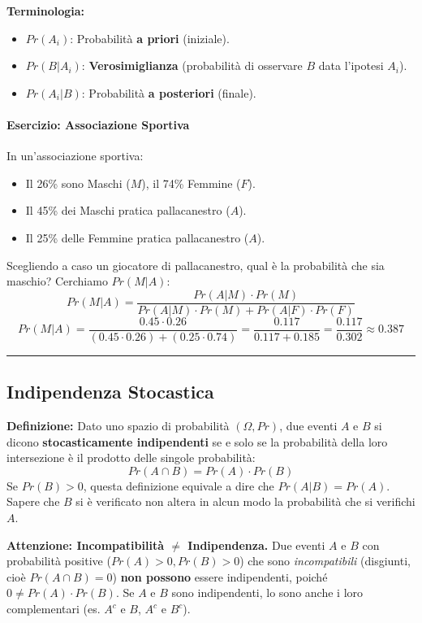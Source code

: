\documentclass[12pt, a4paper]{article}
\begin{document}
\textbf{Terminologia:}
\begin{itemize}
    \item $Pr(A_i)$: Probabilità \textbf{a priori} (iniziale).
    \item $Pr(B | A_i)$: \textbf{Verosimiglianza} (probabilità di osservare $B$ data l'ipotesi $A_i$).
    \item $Pr(A_i | B)$: Probabilità \textbf{a posteriori} (finale).
\end{itemize}

\paragraph{Esercizio: Associazione Sportiva}
In un'associazione sportiva:
\begin{itemize}
    \item Il 26\% sono Maschi ($M$), il 74\% Femmine ($F$).
    \item Il 45\% dei Maschi pratica pallacanestro ($A$).
    \item Il 25\% delle Femmine pratica pallacanestro ($A$).
\end{itemize}
Scegliendo a caso un giocatore di pallacanestro, qual è la probabilità che sia maschio? Cerchiamo $Pr(M | A)$:
$$ Pr(M | A) = \frac{Pr(A | M) \cdot Pr(M)}{Pr(A | M) \cdot Pr(M) + Pr(A | F) \cdot Pr(F)} $$
$$ Pr(M | A) = \frac{0.45 \cdot 0.26}{(0.45 \cdot 0.26) + (0.25 \cdot 0.74)} = \frac{0.117}{0.117 + 0.185} = \frac{0.117}{0.302} \approx 0.387 $$

\vspace{0.5cm}\hrule\vspace{0.5cm}

\subsection{Indipendenza Stocastica}
\textbf{Definizione:} Dato uno spazio di probabilità $(\Omega, Pr)$, due eventi $A$ e $B$ si dicono \textbf{stocasticamente indipendenti} se e solo se la probabilità della loro intersezione è il prodotto delle singole probabilità:
$$ Pr(A \cap B) = Pr(A) \cdot Pr(B) $$
Se $Pr(B) > 0$, questa definizione equivale a dire che $Pr(A | B) = Pr(A)$. Sapere che $B$ si è verificato non altera in alcun modo la probabilità che si verifichi $A$.

\textbf{Attenzione: Incompatibilità $\neq$ Indipendenza.}
Due eventi $A$ e $B$ con probabilità positive ($Pr(A)>0, Pr(B)>0$) che sono \textit{incompatibili} (disgiunti, cioè $Pr(A \cap B) = 0$) \textbf{non possono} essere indipendenti, poiché $0 \neq Pr(A) \cdot Pr(B)$.
Se $A$ e $B$ sono indipendenti, lo sono anche i loro complementari (es. $A^c$ e $B$, $A^c$ e $B^c$).
\end{document}
